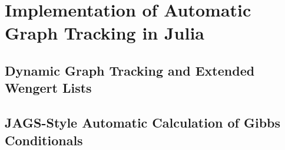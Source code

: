 \chapter{Implementation of Automatic Graph Tracking in Julia}
\label{cha:impl-autom-graph}


\section{Dynamic Graph Tracking and Extended Wengert Lists}
\label{sec:dynam-graph-track}


\section{JAGS-Style Automatic Calculation of Gibbs Conditionals}
\label{sec:jags-style-automatic}



